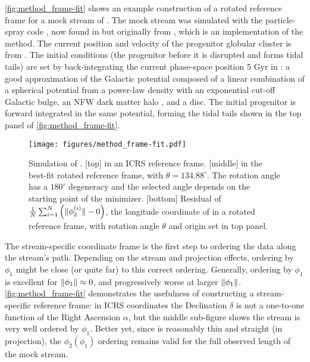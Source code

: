 \documentclass[fleqn,usenatbib]{mnras}
\begin{document}
    \autoref{fig:method_frame-fit} shows an example construction of a rotated
    reference frame for a mock stream of  \citep{El-Falou2022}.
    The mock stream was simulated with the particle-spray code
    \galpystreamspraydf{} \citep{Qian2022}, now found in \galpy{}
    \citep{Bovy2015} but originally from 
    \citep{Banik2009}, which is an implementation of the \citet{Fardal2015}
    method. The current position and velocity of the progenitor globular cluster
    is from \citet{Vasiliev2019}. The initial conditions (the progenitor before
    it is disrupted and forms tidal tails) are set by back-integrating the
    current phase-space position 5 Gyr in \galpyMWPotential{} \citep{Bovy2015}:
    a good approximation of the Galactic potential \citep{Bovy2016cx} composed
    of a linear combination of a spherical potential from a power-law density
    with an exponential cut-off Galactic bulge, an NFW dark matter halo
    \citep{NFW1996}, and a \citet{Miyamoto1975} disc. The initial progenitor is
    forward integrated in the same potential, forming the tidal tails shown in
    the top panel of \autoref{fig:method_frame-fit}.
    \begin{figure}
      \centering
      \hspace*{-10pt}
      \texttt{[image: figures/method\_frame-fit.pdf]}
      \caption{ Simulation of  \citep{El-Falou2022}.
        [top]  in an ICRS reference frame.
        [middle]  in the best-fit rotated reference frame, with
        $\theta = 134.88^\circ$. The rotation angle has a $180^\circ$ degeneracy
        and the selected angle depends on the starting point of the minimizer.
        [bottom] Residual of
        $\frac{1}{N}\sum_{i=1}^{N}\left({\lVert \phi_2^{(i)} \rVert - 0}\right)$, the
        longitude coordinate of  in a rotated reference frame,
        with rotation angle $\theta$ and origin set in top panel. }
      \label{fig:method_frame-fit}
    \end{figure}
    The stream-specific coordinate frame is the first step to ordering the data
    along the stream's path. Depending on the stream and projection effects,
    ordering by $\phi_1$ might be close (or quite far) to this correct ordering.
    Generally, ordering by $\phi_1$ is excellent for $\lVert \phi_1 \rVert \approx 0$,
    and progressively worse at larger $\lVert \phi_1 \rVert$.
    \autoref{fig:method_frame-fit} demonstrates the usefulness of constructing a
    stream-specific reference frame: in ICRS coordinates the Declination
    $\delta$ is not a one-to-one function of the Right Ascension $\alpha$, but
    the middle sub-figure shows the stream is very well ordered by $\phi_1$.
    Better yet, since  is reasonably thin and straight (in
    projection), the $\phi_2(\phi_1)$ ordering remains valid for the full
    observed length of the  mock stream.
\end{document}
